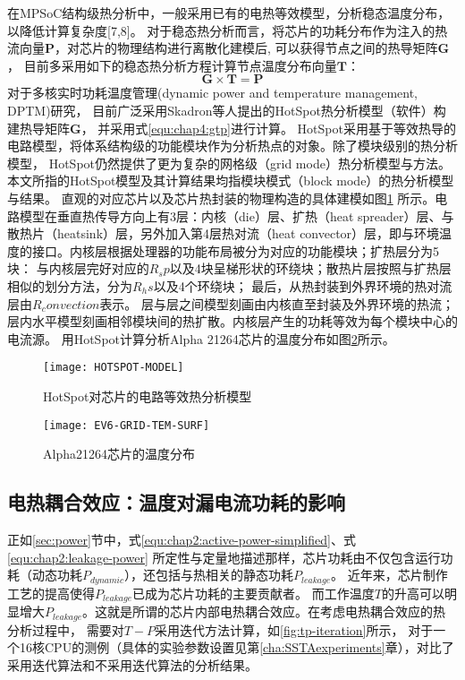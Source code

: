 在MPSoC结构级热分析中，一般采用已有的电热等效模型，分析稳态温度分布，以降低计算复杂度[7,8]。 对于稳态热分析而言，将芯片的功耗分布作为注入的热流向量$\mathbf{P}$，对芯片的物理结构进行离散化建模后, 可以获得节点之间的热导矩阵$\mathbf{G}$， 目前多采用如下的稳态热分析方程计算节点温度分布向量$\mathbf{T}$：
\begin{equation}
\label{equ:chap4:gtp}
\mathbf{G} \times \mathbf{T} = \mathbf{P}
\end{equation}
对于多核实时功耗温度管理(dynamic power and temperature management, DPTM)研究， 目前广泛采用Skadron等人提出的HotSpot热分析模型（软件）构建热导矩阵$\mathbf{G}$， 并采用式\ref{equ:chap4:gtp}进行计算。 HotSpot采用基于等效热导的电路模型，将体系结构级的功能模块作为分析热点的对象。除了模块级别的热分析模型， HotSpot仍然提供了更为复杂的网格级（grid mode）热分析模型与方法。本文所指的HotSpot模型及其计算结果均指模块模式（block mode）的热分析模型与结果。 直观的对应芯片以及芯片热封装的物理构造的具体建模如图\ref{fig:hotspot-model} 所示。电路模型在垂直热传导方向上有3层：内核（die）层、扩热（heat spreader）层、与散热片（heatsink）层，另外加入第4层热对流（heat convector）层，即与环境温度的接口。内核层根据处理器的功能布局被分为对应的功能模块；扩热层分为5块： 与内核层完好对应的$R_sp$以及4块呈梯形状的环绕块；散热片层按照与扩热层相似的划分方法，分为$R_hs$以及4个环绕块； 最后，从热封装到外界环境的热对流层由$R_convection$表示。 层与层之间模型刻画由内核直至封装及外界环境的热流； 层内水平模型刻画相邻模块间的热扩散。内核层产生的功耗等效为每个模块中心的电流源。 用HotSpot计算分析Alpha 21264芯片的温度分布如图\ref{fig:ev6-grid-temp-surf}所示。

\begin{figure}[H]
  \centering
  \texttt{[image: HOTSPOT-MODEL]}
  \caption{HotSpot对芯片的电路等效热分析模型}
  \label{fig:hotspot-model}
\end{figure}

\begin{figure}[H]
  \centering
  \texttt{[image: EV6-GRID-TEM-SURF]}
  \caption{Alpha21264芯片的温度分布}
  \label{fig:ev6-grid-temp-surf}
\end{figure}


\subsection{电热耦合效应：温度对漏电流功耗的影响}
正如\ref{sec:power}节中，式\ref{equ:chap2:active-power-simplified}、式\ref{equ:chap2:leakage-power} 所定性与定量地描述那样，芯片功耗由不仅包含运行功耗（动态功耗$P_{dynamic}$），还包括与热相关的静态功耗$P_{leakage}$。 近年来，芯片制作工艺的提高使得$P_{leakage}$已成为芯片功耗的主要贡献者。 而工作温度$T$的升高可以明显增大$P_{leakage}$。这就是所谓的芯片内部电热耦合效应。在考虑电热耦合效应的热分析过程中， 需要对$T-P$采用迭代方法计算，如\ref{fig:tp-iteration}所示， 对于一个16核CPU的测例（具体的实验参数设置见第\ref{cha:SSTAexperiments}章），对比了采用迭代算法和不采用迭代算法的分析结果。

